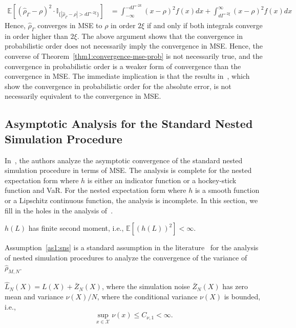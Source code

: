 \begin{align*}
    \mathbb{E} \left[ \left(\hat{\rho}_{\Gamma} - \rho\right)^2 \cdot \mathbb{I}_{\{|\hat{\rho}_{\Gamma} - \rho| > d\Gamma^{-2\xi}\}} \right] 
    & = \int_{-\infty}^{-d\Gamma^{-2k}} (x - \rho)^2 f(x) dx + \int_{d\Gamma^{-2\xi}}^{\infty} (x - \rho)^2 f(x) dx 
\end{align*}
Hence, $\hat{\rho}_{\Gamma}$ converges in MSE to $\rho$ in order $2\xi$ if and only if both integrals converge in order higher than $2\xi$. 
The above argument shows that the convergence in probabilistic order does not necessarily imply the convergence in MSE.
Hence, the converse of Theorem~\ref{thm1:convergence-mse-prob} is not necessarily true, and the convergence in probabilistic order is a weaker form of convergence than the convergence in MSE.
The immediate implication is that the results in~\cite{wang2022smooth}, which show the convergence in probabilistic order for the absolute error, is not necessarily equivalent to the convergence in MSE.

\subsection{Asymptotic Analysis for the Standard Nested Simulation Procedure}
In~\cite{gordy2010nested}, the authors analyze the asymptotic convergence of the standard nested simulation procedure in terms of MSE. 
The analysis is complete for the nested expectation form where $h$ is either an indicator function or a hockey-stick function and VaR. 
For the nested expectation form where $h$ is a smooth function or a Lipschitz continuous function, the analysis is incomplete.
In this section, we fill in the holes in the analysis of~\cite{gordy2010nested}.

\begin{assumption} \label{as1:sns}
    $h(L)$ has finite second moment, i.e., $\mathbb{E} \left[ \left( h(L) \right)^2 \right] < \infty$.
\end{assumption}

Assumption~\ref{as1:sns} is a standard assumption in the literature~\citep{hong2017kernel} for the analysis of nested simulation procedures to analyze the convergence of the variance of $\hat{\rho}_{M, N}$.

\begin{assumption} \label{as1:sns-noise}
    $\hat{L}_N(X) = L(X) + \bar{Z}_N(X)$, where the simulation noise $\bar{Z}_N(X)$ has zero mean and variance $\nu(X) / N$, where the conditional variance $\nu(X)$ is bounded, i.e., 
    $$
        \sup_{x \in \mathcal{X}} \nu(x) \leq C_{\nu, 1} < \infty.
    $$
\end{assumption}


